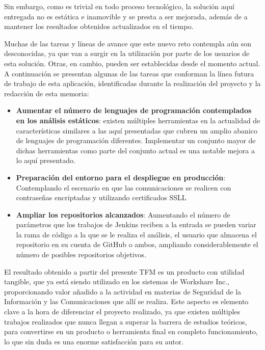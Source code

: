 Sin embargo, como es trivial en todo proceso tecnológico, la solución aquí entregada no es estática e inamovible y se presta a ser mejorada, además de a mantener los resultados obtenidos actualizados en el tiempo.

Muchas de las tareas y líneas de avance que este nuevo reto contempla aún son desconocidas, ya que van a surgir en la utilización por parte de los usuarios de esta solución. Otras, en cambio, pueden ser establecidas desde el momento actual. A continuación se presentan algunas de las tareas que conforman la línea futura de trabajo de esta aplicación, identificadas durante la realización del proyecto y la redacción de esta memoria:

\begin{itemize}
	\item \textbf{Aumentar el número de lenguajes de programación contemplados en los análisis estáticos}: existen múltiples herramientas en la actualidad de características similares a las aquí presentadas que cubren un amplio abanico de lenguajes de programación diferentes. Implementar un conjunto mayor de dichas herramientas como parte del conjunto actual es una notable mejora a lo aquí presentado.
	\item \textbf{Preparación del entorno para el despliegue en producción}: Contemplando el escenario en que las comunicaciones se realicen con contraseñas encriptadas y utilizando certificados SSLL
	\item \textbf{Ampliar los repositorios alcanzados}: Aumentando el número de parámetros que los trabajos de Jenkins reciben a la entrada se pueden variar la rama de código a la que se le realiza el análisis, el usuario que almacena el repositorio en su cuenta de GitHub o ambos, ampliando considerablemente el número de posibles repositorios objetivos.  
\end{itemize}

El resultado obtenido a partir del presente \gls{TFM} es un producto con utilidad tangible, que ya está siendo utilizado en los sistemas de Workshare Inc., proporcionando valor añadido a la actividad en materias de Seguridad de la Información y las Comunicaciones que allí se realiza. Este aspecto es elemento clave a la hora de diferenciar el proyecto realizado, ya que existen múltiples trabajos realizados que nunca llegan a superar la barrera de estudios teóricos, para convertirse en un producto o herramienta final en completo funcionamiento, lo que sin duda es una enorme satisfacción para su autor.

\endinput
